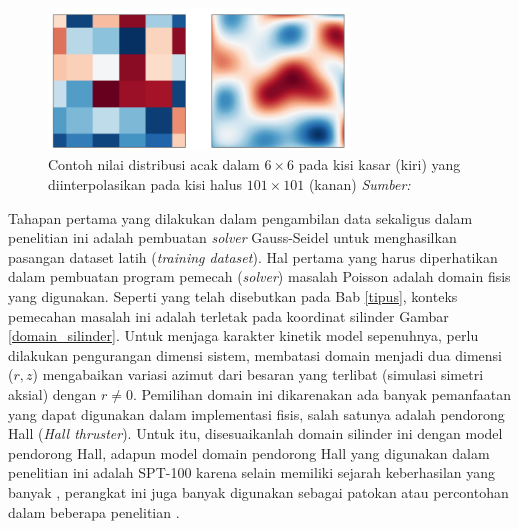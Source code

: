 \begin{figure}[h!]
    \centering
    \includegraphics[width=8cm]{gambar/random.png}
    \caption{Contoh nilai distribusi acak dalam $6 \times 6$ pada kisi kasar (kiri) yang diinterpolasikan pada kisi halus $101 \times 101$ (kanan) \emph{Sumber: \citep{cheng_illarramendi_bauerheim_cuenot_2021}}}
\end{figure}

Tahapan pertama yang dilakukan dalam pengambilan data sekaligus dalam penelitian ini adalah pembuatan \emph{solver} Gauss-Seidel untuk menghasilkan pasangan dataset latih (\emph{training dataset}). Hal pertama yang harus diperhatikan dalam pembuatan program pemecah (\emph{solver}) masalah Poisson adalah domain fisis yang digunakan. Seperti yang telah disebutkan pada Bab \ref{tipus}, konteks pemecahan masalah ini adalah terletak pada koordinat silinder Gambar \ref{domain_silinder}. Untuk menjaga karakter kinetik model sepenuhnya, perlu dilakukan pengurangan dimensi sistem, membatasi domain menjadi dua dimensi ($r,z$) mengabaikan variasi azimut dari besaran yang terlibat (simulasi simetri aksial) \citep{f_taccogna_longo_capitelli_schneider_2005} dengan $r \neq 0$. Pemilihan domain ini dikarenakan ada banyak pemanfaatan yang dapat digunakan dalam implementasi fisis, salah satunya adalah pendorong Hall (\emph{Hall thruster}). Untuk itu, disesuaikanlah domain silinder ini dengan model pendorong Hall, adapun model domain pendorong Hall yang digunakan dalam penelitian ini adalah SPT-100 karena selain memiliki sejarah keberhasilan yang banyak \citep{braga_miranda_2019}, perangkat ini juga banyak digunakan sebagai patokan atau percontohan dalam beberapa penelitian \citep{Shiferaw2013, f_taccogna_longo_capitelli_schneider_2005, braga_miranda_2019, boeuf_2017}.

